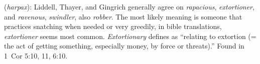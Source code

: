 \item[Extortionary,]

(\textit{harpax}):
Liddell, Thayer, and Gingrich generally agree on \emph{rapacious}, \emph{extortioner}, and \emph{ravenous}, \emph{swindler}, also \emph{robber}. The most likely meaning is someone that practices snatching when needed or very greedily, in bible translations, \emph{extortioner} seems most common. \emph{Extortionary} defines as ``relating to extortion (= the act of getting something, especially money, by force or threats).''
Found in 1~Cor 5:10, 11, 6:10.
